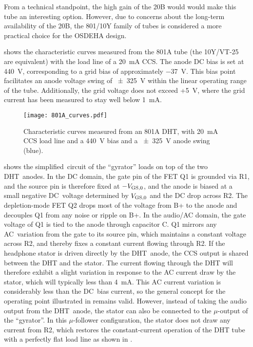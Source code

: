 From a technical standpoint, the high gain of the 20B would would make this tube an interesting option. However, due to concerns about the long-term availability of the 20B, the 801/10Y family of tubes is considered a more practical choice for the OSDEHA design.

 shows the characteristic curves measured from the 801A tube (the 10Y/VT-25 are equivalent) with the load line of a \SI{20}{mA} CCS. The anode DC bias is set at \SI{440}{V}, corresponding to a grid bias of approximately \SI{-37}{V}. This bias point facilitates an anode voltage swing of \SI{\pm325}{V} within the linear operating range of the tube. Additionally, the grid voltage does not exceed +\SI{5}{V}, where the grid current has been measured to stay well below \SI{1}{mA}.

\begin{figure}
\begin{center}
\texttt{[image: 801A\_curves.pdf]}
\caption{Characteristic curves measured from an 801A DHT, with \SI{20}{mA} CCS load line and a \SI{440}{V} bias and a \SI{\pm325}{V} anode swing (blue).}
\end{center}
\end{figure}

 shows the simplified circuit of the ``gyrator'' loads on top of the two DHT anodes. In the DC domain, the gate pin of the FET Q1 is grounded via R1, and the source pin is therefore fixed at $-V_{\rm GS,0}$, and the anode is biased at a small negative DC voltage determined by $V_{\rm GS,0}$ and the DC drop across R2. The depletion-mode FET Q2 drops most of the voltage from B+ to the anode and decouples Q1 from any noise or ripple on B+. In the audio/AC domain, the gate voltage of Q1 is tied to the anode through capacitor C. Q1 mirrors any AC variation from the gate to its source pin, which maintains a constant voltage across R2, and thereby fixes a constant current flowing through R2. If the headphone stator is driven directly by the DHT anode, the CCS output is shared between the DHT and the stator. The current flowing through the DHT will therefore exhibit a slight variation in response to the AC current draw by the stator, which will typically less than \SI{4}{mA}\cite{osdeha_p8}. This AC current variation is considerably less than the DC bias current, so the general concept for the operating point illustrated in  remains valid. However, instead of taking the audio output from the DHT anode, the stator can also be connected to the $\mu$-output of the ``gyrator''. In this $\mu$-follower configuration\cite{pimm_ccs,kimmel_mustage}, the stator does not draw any current from R2, which restores the constant-current operation of the DHT tube with a perfectly flat load line as shown in .

